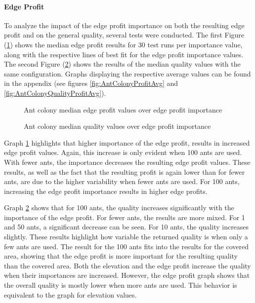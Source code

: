\paragraph{Edge Profit}

To analyze the impact of the edge profit importance on both the resulting edge profit and on the general quality, several tests were conducted.
The first Figure (\ref{fig:AntColonyProfitMed}) shows the median edge profit results for 30 test runs per importance value, along with the respective lines of best fit for the edge profit importance values.
The second Figure (\ref{fig:AntColonyQualityProfitMed}) shows the results of the median quality values with the same configuration.
Graphs displaying the respective average values can be found in the appendix (see figures \ref{fig:AntColonyProfitAvg} and \ref{fig:AntColonyQualityProfitAvg}).


\begin{figure}
	\centering
	
	\caption{Ant colony median edge profit values over edge profit importance}
	\label{fig:AntColonyProfitMed}
\end{figure}


\begin{figure}
	\centering
	
	\caption{Ant colony median quality values over edge profit importance}
	\label{fig:AntColonyQualityProfitMed}
\end{figure}


Graph \ref{fig:AntColonyProfitMed} highlights that higher importance of the edge profit, results in increased edge profit values. 
Again, this increase is only evident when 100 ants are used. 
With fewer ants, the importance decreases the resulting edge profit values.
These results, as well as the fact that the resulting profit is again lower than for fewer ants, are due to the higher variability when fewer ants are used.
For 100 ants, increasing the edge profit importance results in higher edge profits.


Graph \ref{fig:AntColonyQualityProfitMed} shows that for 100 ants, the quality increases significantly with the importance of the edge profit.
For fewer ants, the results are more mixed.
For 1 and 50 ants, a significant decrease can be seen.
For 10 ants, the quality increases slightly.
These results highlight how variable the returned quality is when only a few ants are used.
The result for the 100 ants fits into the results for the covered area, showing that the edge profit is more important for the resulting quality than the covered area. 
Both the elevation and the edge profit increase the quality when their importances are increased.
However, the edge profit graph shows that the overall quality is mostly lower when more ants are used.
This behavior is equivalent to the graph for elevation values.


